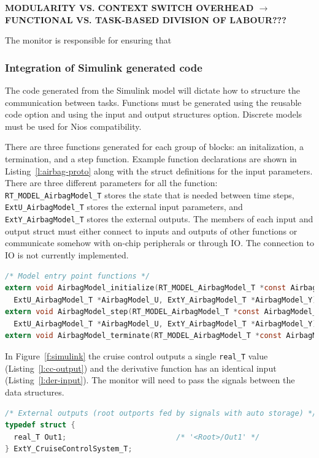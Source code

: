 \documentclass[table,11pt]{article}
\newcommand{\todojc}[1]{\todo[inline]{JC: #1}}
\begin{document}
\textbf{MODULARITY VS. CONTEXT SWITCH OVERHEAD $\rightarrow$ FUNCTIONAL VS. TASK-BASED DIVISION OF LABOUR???}

The monitor is responsible for ensuring that 

\subsubsection{Integration of Simulink generated code}

The code generated from the Simulink model will dictate how to structure the communication between tasks. Functions must be generated using the reusable code option and using the input and output structures option. Discrete models must be used for Nios compatibility.

\todojc{show simulink options menu figure here}
There are three functions generated for each group of blocks: an initalization, a termination, and a step function. Example function declarations are shown in Listing~\ref{l:airbag-proto} along with the struct definitions for the input parameters. There are three different parameters for all the function: 
\texttt{RT\_MODEL\_AirbagModel\_T} stores the state that is needed between time steps, \texttt{ExtU\_AirbagModel\_T} stores the external input parameters, and \texttt{ExtY\_AirbagModel\_T} stores the external outputs. The members of each input and output struct must either connect to inputs and outputs of other functions or communicate somehow with on-chip peripherals or through IO. The connection to IO is not currently implemented.

\begin{lstlisting}[caption={Airbag model function declarations},label=l:airbag-proto,language=C]
/* Model entry point functions */
extern void AirbagModel_initialize(RT_MODEL_AirbagModel_T *const AirbagModel_M,
  ExtU_AirbagModel_T *AirbagModel_U, ExtY_AirbagModel_T *AirbagModel_Y);
extern void AirbagModel_step(RT_MODEL_AirbagModel_T *const AirbagModel_M,
  ExtU_AirbagModel_T *AirbagModel_U, ExtY_AirbagModel_T *AirbagModel_Y);
extern void AirbagModel_terminate(RT_MODEL_AirbagModel_T *const AirbagModel_M);
\end{lstlisting}

In Figure~\ref{f:simulink} the cruise control outputs a single \texttt{real\_T} value (Listing~\ref{l:cc-output}) and the derivative function has an identical input (Listing~\ref{l:der-input}). The monitor will need to pass the signals between the data structures.
\begin{lstlisting}[caption={Cruise control output struct definition},label=l:cc-output,language=C]
/* External outputs (root outports fed by signals with auto storage) */
typedef struct {
  real_T Out1;                         /* '<Root>/Out1' */
} ExtY_CruiseControlSystem_T;
\end{lstlisting}
\end{document}
